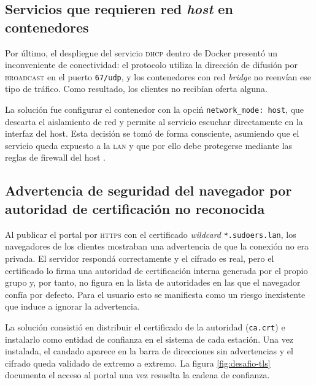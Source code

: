 \subsection{Servicios que requieren red \textit{host} en contenedores}

Por \'ultimo, el despliegue del servicio \textsc{dhcp} dentro de Docker
present\'o un inconveniente de conectividad: el protocolo utiliza la
direcci\'on de difusi\'on por \textsc{broadcast} en el puerto
\texttt{67/udp}, y los contenedores con red \textit{bridge} no reenv\'ian
ese tipo de tr\'afico. Como resultado, los clientes no recib\'ian oferta
alguna.

La soluci\'on fue configurar el contenedor con la opci\'n
\texttt{network\_mode: host}, que descarta el aislamiento de red y permite
al servicio escuchar directamente en la interfaz del host. Esta decisi\'on
se tom\'o de forma consciente, asumiendo que el servicio queda expuesto a
la \textsc{lan} y que por ello debe protegerse mediante las reglas de
firewall del host \cite{stewart2017}.

\subsection{Advertencia de seguridad del navegador por autoridad de certificaci\'on no reconocida}

Al publicar el portal por \textsc{https} con el certificado
\textit{wildcard} \texttt{*.sudoers.lan}, los navegadores de los clientes
mostraban una advertencia de que la conexi\'on no era privada. El servidor
respond\'a correctamente y el cifrado es real, pero el certificado lo firma
una autoridad de certificaci\'on interna generada por el propio grupo y, por
tanto, no figura en la lista de autoridades en las que el navegador conf\'ia
por defecto. Para el usuario esto se manifiesta como un riesgo inexistente
que induce a ignorar la advertencia.

La soluci\'on consisti\'o en distribuir el certificado de la autoridad
(\texttt{ca.crt}) e instalarlo como entidad de confianza en el sistema de
cada estaci\'on. Una vez instalada, el candado aparece en la barra de
direcciones sin advertencias y el cifrado queda validado de extremo a
extremo. La figura \ref{fig:desafio-tls} documenta el acceso al portal una
vez resuelta la cadena de confianza.


